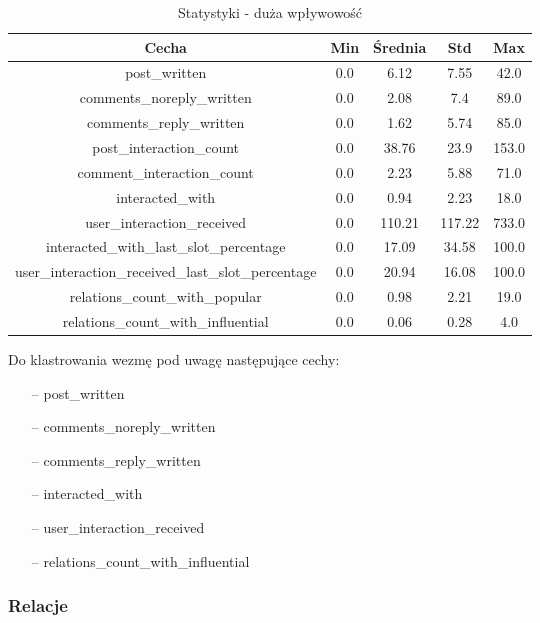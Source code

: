 \documentclass[polish,12pt]{aghthesis}
\begin{document}
\begin{table}[ht]
    \centering
  \begin{center}
  \begin{tabular}{|c|c|c|c|c|}
  \hline
  Cecha & Min & Średnia & Std & Max  \\
  \hline
post\_written & 0.0 & 6.12 & 7.55 & 42.0 \\
\hline
comments\_noreply\_written & 0.0 & 2.08 & 7.4 & 89.0 \\
\hline
comments\_reply\_written & 0.0 & 1.62 & 5.74 & 85.0 \\
\hline
post\_interaction\_count & 0.0 & 38.76 & 23.9 & 153.0 \\
\hline
comment\_interaction\_count & 0.0 & 2.23 & 5.88 & 71.0 \\
\hline
interacted\_with & 0.0 & 0.94 & 2.23 & 18.0 \\
\hline
user\_interaction\_received & 0.0 & 110.21 & 117.22 & 733.0 \\
\hline
interacted\_with\_last\_slot\_percentage & 0.0 & 17.09 & 34.58 & 100.0 \\
\hline
user\_interaction\_received\_last\_slot\_percentage & 0.0 & 20.94 & 16.08 & 100.0 \\
\hline
relations\_count\_with\_popular & 0.0 & 0.98 & 2.21 & 19.0 \\
\hline
relations\_count\_with\_influential & 0.0 & 0.06 & 0.28 & 4.0 \\
\hline
  \end{tabular}
\end{center}
\caption{Statystyki - duża wpływowość}
\label{tab:ii3}
\end{table}

\FloatBarrier

Do klastrowania wezmę pod uwagę następujące cechy:

\begin{itemize}
    \setlength\itemsep{0,005em}
    \item[--] post\_written
    \item[--] comments\_noreply\_written 
    \item[--] comments\_reply\_written
    \item[--] interacted\_with
    \item[--] user\_interaction\_received
    \item[--] relations\_count\_with\_influential
\end{itemize}


\subsubsection{Relacje}
\end{document}
